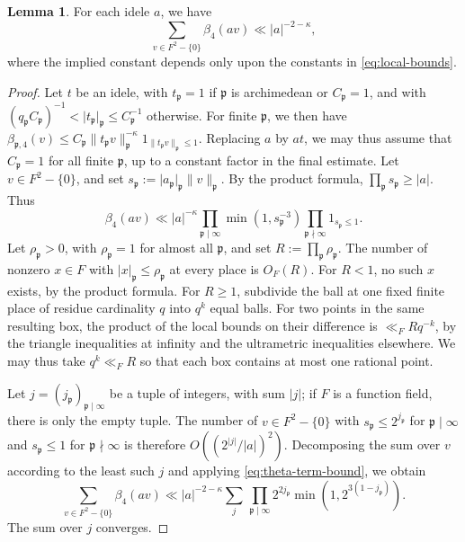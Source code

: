 \documentclass[reqno]{amsart}
\theoremstyle{plain}
\theoremstyle{definition}
\theoremstyle{itplain}
\newtheorem{lemma}[theorem]{Lemma}
\numberwithin{equation}{section}
\numberwithin{theorem}{section}
\begin{document}
\begin{lemma}\label{lemma:theta-bounds}
  For each idele $a$, we have
  \begin{equation*}
    \sum_{v \in F^2 - \{0\}} \beta_4(a v) \ll \lvert a \rvert^{-2 - \kappa},
  \end{equation*}
  where the implied constant depends only upon the constants in \eqref{eq:local-bounds}.
\end{lemma}
\begin{proof}
  Let $t$ be an idele, with $t_{\mathfrak{p}} = 1$ if $\mathfrak{p}$ is archimedean or $C_{\mathfrak{p}} = 1$, and with $(q_{\mathfrak{p}} C_{\mathfrak{p}})^{-1} < \lvert t_{\mathfrak{p}} \rvert_{\mathfrak{p}} \leq C_{\mathfrak{p}}^{-1}$ otherwise.  For finite $\mathfrak{p}$, we then have $\beta_{\mathfrak{p}, 4}(v) \leq C_{\mathfrak{p}} \lVert t_{\mathfrak{p}} v \rVert_{\mathfrak{p}}^{-\kappa} 1_{\lVert t_{\mathfrak{p}} v \rVert_{\mathfrak{p}} \leq 1}$.  Replacing $a$ by $a t$, we may thus assume that $C_{\mathfrak{p}} = 1$ for all finite $\mathfrak{p}$, up to a constant factor in the final estimate.  Let $v \in F^2 - \{0\}$, and set $s_{\mathfrak{p}} := \lvert a_{\mathfrak{p}} \rvert_{\mathfrak{p}} \lVert v \rVert_{\mathfrak{p}}$.  By the product formula, $\prod_{\mathfrak{p}} s_{\mathfrak{p}} \geq \lvert a \rvert$.  Thus
  \begin{equation}\label{eq:theta-term-bound}
    \beta_4(a v) \ll \lvert a \rvert^{- \kappa}
    \prod_{\mathfrak{p} \mid \infty} \min(1, s_{\mathfrak{p}}^{-3})
    \prod_{\mathfrak{p} \nmid \infty} 1_{s_{\mathfrak{p}} \leq 1}.
  \end{equation}
  Let $\rho_{\mathfrak{p}} > 0$, with $\rho_{\mathfrak{p}} = 1$ for almost all $\mathfrak{p}$, and set $R := \prod_{\mathfrak{p}} \rho_{\mathfrak{p}}$.  The number of nonzero $x \in F$ with $\lvert x \rvert_{\mathfrak{p}} \leq \rho_{\mathfrak{p}}$ at every place is $O_F(R)$.  For $R < 1$, no such $x$ exists, by the product formula.  For $R \geq 1$, subdivide the ball at one fixed finite place of residue cardinality $q$ into $q^k$ equal balls.  For two points in the same resulting box, the product of the local bounds on their difference is $\ll_F R q^{-k}$, by the triangle inequalities at infinity and the ultrametric inequalities elsewhere.  We may thus take $q^k \ll_F R$ so that each box contains at most one rational point.

  Let $j = (j_{\mathfrak{p}})_{\mathfrak{p} \mid \infty}$ be a tuple of integers, with sum $\lvert j \rvert$; if $F$ is a function field, there is only the empty tuple.  The number of $v \in F^2 - \{0\}$ with $s_{\mathfrak{p}} \leq 2^{j_{\mathfrak{p}}}$ for $\mathfrak{p} \mid \infty$ and $s_{\mathfrak{p}} \leq 1$ for $\mathfrak{p} \nmid \infty$ is therefore $O((2^{\lvert j \rvert} / \lvert a \rvert)^2)$.  Decomposing the sum over $v$ according to the least such $j$ and applying \eqref{eq:theta-term-bound}, we obtain
  \begin{equation*}
    \sum_{v \in F^2 - \{0\}} \beta_4(a v) \ll \lvert a \rvert^{- 2 - \kappa}
    \sum_{j} \,
    \prod_{\mathfrak{p} \mid \infty} 2^{2 j_{\mathfrak{p}}} \min(1, 2^{3 (1 - j_{\mathfrak{p}})}).
  \end{equation*}
  The sum over $j$ converges.
\end{proof}
\end{document}
